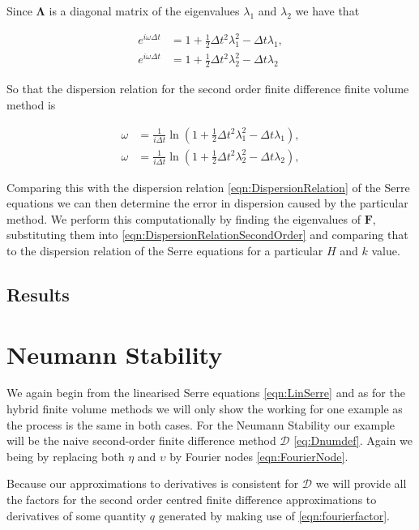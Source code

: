 Since $\boldsymbol{\Lambda}$ is a diagonal matrix of the eigenvalues $\lambda_1$ and $\lambda_2$ we have that

\begin{align*}
e^{i\omega\Delta t} &= 1 + \frac{1}{2}\Delta t^2 \lambda_{1}^2  -\Delta t\lambda_{1}, \\
e^{i\omega\Delta t} &= 1 + \frac{1}{2}\Delta t^2 \lambda_{2}^2  -\Delta t\lambda_{2}
\end{align*}

So that the dispersion relation for the second order finite difference finite volume method is

\begin{align}
\label{eqn:DispersionRelationSecondOrder}
\omega &= \frac{1}{i \Delta t} \ln \left(1 + \frac{1}{2}\Delta t^2 \lambda_{1}^2  -\Delta t\lambda_{1}\right), \\
\omega &= \frac{1}{i \Delta t} \ln \left(1 + \frac{1}{2}\Delta t^2 \lambda_{2}^2  -\Delta t\lambda_{2}\right),
\end{align}

Comparing this with the dispersion relation \eqref{eqn:DispersionRelation} of the Serre equations we can then determine the error in dispersion caused by the particular method. We perform this computationally by finding the eigenvalues of $\boldsymbol{F}$, substituting them into \eqref{eqn:DispersionRelationSecondOrder} and comparing that to the dispersion relation of the Serre equations for a particular $H$ and $k$ value. 


\subsection{Results}


\section{Neumann Stability}

We again begin from the linearised Serre equations \eqref{eqn:LinSerre} and as for the hybrid finite volume methods we will only show the working for one example as the process is the same in both cases. For the Neumann Stability our example will be the naive second-order finite difference method $\mathcal{D}$ \eqref{eq:Dnumdef}. Again we being by replacing both $\eta$ and $\upsilon$ by Fourier nodes \eqref{eqn:FourierNode}.

Because our approximations to derivatives is consistent for $\mathcal{D}$ we will provide all the factors for the second order centred finite difference approximations to derivatives of some quantity $q$ generated by making use of \eqref{eqn:fourierfactor}.

